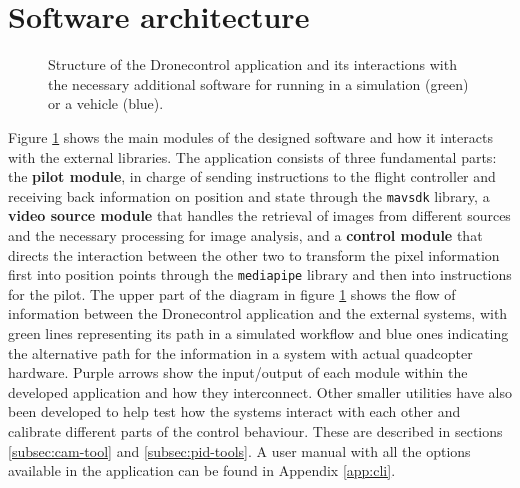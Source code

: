 \section{Software architecture}

\begin{figure}
  \centering
  \caption{Structure of the Dronecontrol application and its interactions with the necessary additional software for running in a simulation (green) or a vehicle (blue).}
\label{fig:architecture}
\end{figure}


Figure \ref{fig:architecture} shows the main modules of the designed software and how it interacts with the external libraries.
The application consists of three fundamental parts: the \textbf{pilot module}, in charge of sending instructions to the flight controller and receiving back information on position and state through the \texttt{mavsdk} library, 
a \textbf{video source module} that handles the retrieval of images from different sources and the necessary processing for image analysis,
and a \textbf{control module} that directs the interaction between the other two to transform the pixel information first into position points through the \texttt{mediapipe} library and then into instructions for the pilot.
The upper part of the diagram in figure \ref{fig:architecture} shows the flow of information between the Dronecontrol application and the external systems, with green lines representing its path in a simulated workflow and blue ones indicating the alternative path for the information in a system with actual quadcopter hardware.
Purple arrows show the input/output of each module within the developed application and how they interconnect.
Other smaller utilities have also been developed to help test how the systems interact with each other and calibrate different parts of the control behaviour.
These are described in sections \ref{subsec:cam-tool} and \ref{subsec:pid-tools}.
A user manual with all the options available in the application can be found in Appendix \ref{app:cli}.


